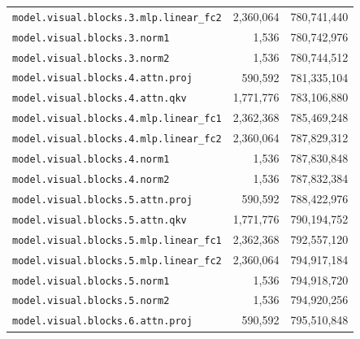 \documentclass[10pt,a4paper]{article}
\theoremstyle{definition}
\begin{document}
\begin{appendices}
\begin{longtable}{p{9.5cm}rr}
\texttt{model.\allowbreak{}visual.\allowbreak{}blocks.\allowbreak{}3.\allowbreak{}mlp.\allowbreak{}linear\_fc2} & 2,360,064 & 780,741,440 \\
\texttt{model.\allowbreak{}visual.\allowbreak{}blocks.\allowbreak{}3.\allowbreak{}norm1} & 1,536 & 780,742,976 \\
\texttt{model.\allowbreak{}visual.\allowbreak{}blocks.\allowbreak{}3.\allowbreak{}norm2} & 1,536 & 780,744,512 \\
\texttt{model.\allowbreak{}visual.\allowbreak{}blocks.\allowbreak{}4.\allowbreak{}attn.\allowbreak{}proj} & 590,592 & 781,335,104 \\
\texttt{model.\allowbreak{}visual.\allowbreak{}blocks.\allowbreak{}4.\allowbreak{}attn.\allowbreak{}qkv} & 1,771,776 & 783,106,880 \\
\texttt{model.\allowbreak{}visual.\allowbreak{}blocks.\allowbreak{}4.\allowbreak{}mlp.\allowbreak{}linear\_fc1} & 2,362,368 & 785,469,248 \\
\texttt{model.\allowbreak{}visual.\allowbreak{}blocks.\allowbreak{}4.\allowbreak{}mlp.\allowbreak{}linear\_fc2} & 2,360,064 & 787,829,312 \\
\texttt{model.\allowbreak{}visual.\allowbreak{}blocks.\allowbreak{}4.\allowbreak{}norm1} & 1,536 & 787,830,848 \\
\texttt{model.\allowbreak{}visual.\allowbreak{}blocks.\allowbreak{}4.\allowbreak{}norm2} & 1,536 & 787,832,384 \\
\texttt{model.\allowbreak{}visual.\allowbreak{}blocks.\allowbreak{}5.\allowbreak{}attn.\allowbreak{}proj} & 590,592 & 788,422,976 \\
\texttt{model.\allowbreak{}visual.\allowbreak{}blocks.\allowbreak{}5.\allowbreak{}attn.\allowbreak{}qkv} & 1,771,776 & 790,194,752 \\
\texttt{model.\allowbreak{}visual.\allowbreak{}blocks.\allowbreak{}5.\allowbreak{}mlp.\allowbreak{}linear\_fc1} & 2,362,368 & 792,557,120 \\
\texttt{model.\allowbreak{}visual.\allowbreak{}blocks.\allowbreak{}5.\allowbreak{}mlp.\allowbreak{}linear\_fc2} & 2,360,064 & 794,917,184 \\
\texttt{model.\allowbreak{}visual.\allowbreak{}blocks.\allowbreak{}5.\allowbreak{}norm1} & 1,536 & 794,918,720 \\
\texttt{model.\allowbreak{}visual.\allowbreak{}blocks.\allowbreak{}5.\allowbreak{}norm2} & 1,536 & 794,920,256 \\
\texttt{model.\allowbreak{}visual.\allowbreak{}blocks.\allowbreak{}6.\allowbreak{}attn.\allowbreak{}proj} & 590,592 & 795,510,848 \\

\end{longtable}
\end{appendices}
\end{document}
